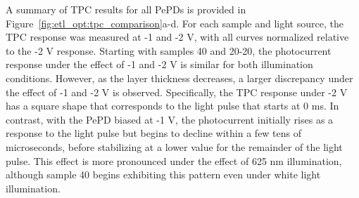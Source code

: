 A summary of TPC results for all PePDs is provided in Figure~\ref{fig:etl_opt:tpc_comparison}a-d. For each sample and light source, the TPC response was measured at -1 and -2 V, with all curves normalized relative to the -2 V response. Starting with samples 40 and 20-20, the photocurrent response under the effect of -1 and -2 V is similar for both illumination conditions. However, as the  layer thickness decreases, a larger discrepancy under the effect of -1 and -2 V is observed. Specifically, the TPC response under -2 V has a square shape that corresponds to the light pulse that starts at 0 ms. In contrast, with the PePD biased at -1 V, the photocurrent initially rises as a response to the light pulse but begins to decline within a few tens of microseconds, before stabilizing at a lower value for the remainder of the light pulse. This effect is more pronounced under the effect of 625 nm illumination, although sample 40 begins exhibiting this pattern even under white light illumination.


